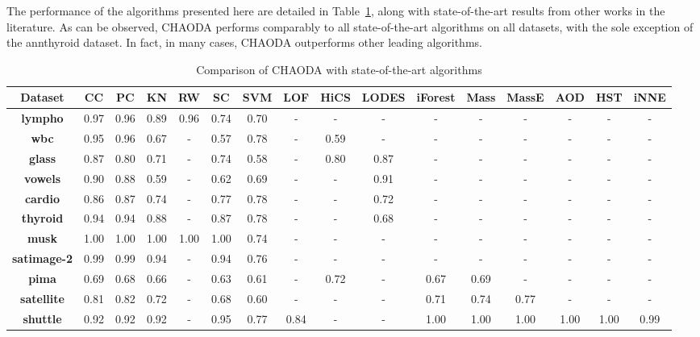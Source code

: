 The performance of the algorithms presented here are detailed in Table~\ref{results:tbl-comparison}, along with state-of-the-art results from other works in the literature.
As can be observed, CHAODA performs comparably to all state-of-the-art algorithms on all datasets, with the sole exception of the annthyroid dataset.
In fact, in many cases, CHAODA outperforms other leading algorithms.

\begin{small}
\begin{table}[!t]
\renewcommand{\arraystretch}{1.3}
\caption{Comparison of CHAODA with state-of-the-art algorithms}
\label{results:tbl-comparison}
\centering
\begin{tabular}{|c|c|c|c|c|c|c|c|c|c|c|c|c|c|c|c|}
\hline
\bfseries Dataset & \bfseries CC & \bfseries PC & \bfseries KN & \bfseries RW & \bfseries SC & \bfseries SVM & \bfseries LOF & \bfseries HiCS & \bfseries LODES & \bfseries iForest & \bfseries Mass & \bfseries MassE & \bfseries AOD & \bfseries HST & \bfseries iNNE \\ 
\hline
\bfseries lympho & 0.97 & 0.96 & 0.89 & 0.96 & 0.74 & 0.70 & - & - & - & - & - & - & - & - & - \\ 
\hline
\bfseries wbc & 0.95 & 0.96 & 0.67 & - & 0.57 & 0.78 & - & 0.59 & - & - & - & - & - & - & - \\ 
\hline
\bfseries glass & 0.87 & 0.80 & 0.71 & - & 0.74 & 0.58 & - & 0.80 & 0.87 & - & - & - & - & - & - \\ 
\hline
\bfseries vowels & 0.90 & 0.88 & 0.59 & - & 0.62 & 0.69 & - & - & 0.91 & - & - & - & - & - & - \\ 
\hline
\bfseries cardio & 0.86 & 0.87 & 0.74 & - & 0.77 & 0.78 & - & - & 0.72 & - & - & - & - & - & - \\ 
\hline
\bfseries thyroid & 0.94 & 0.94 & 0.88 & - & 0.87 & 0.78 & - & - & 0.68 & - & - & - & - & - & - \\ 
\hline
\bfseries musk & 1.00 & 1.00 & 1.00 & 1.00 & 1.00 & 0.74 & - & - & - & - & - & - & - & - & - \\ 
\hline
\bfseries satimage-2 & 0.99 & 0.99 & 0.94 & - & 0.94 & 0.76 & - & - & - & - & - & - & - & - & - \\ 
\hline
\bfseries pima & 0.69 & 0.68 & 0.66 & - & 0.63 & 0.61 & - & 0.72 & - & 0.67 & 0.69 & - & - & - & - \\ 
\hline
\bfseries satellite & 0.81 & 0.82 & 0.72 & - & 0.68 & 0.60 & - & - & - & 0.71 & 0.74 & 0.77 & - & - & - \\ 
\hline
\bfseries shuttle & 0.92 & 0.92 & 0.92 & - & 0.95 & 0.77 & 0.84 & - & - & 1.00 & 1.00 & 1.00 & 1.00 & 1.00 & 0.99 \\ 

\end{tabular}
\end{table}
\end{small}
